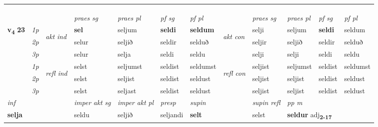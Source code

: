 \begin{longtable}[l]{X>{\footnotesize\itshape}llXXXXlXXXX}
\midrule
 & \\*
   & \\*
  & \\
   \midrule
 & &   & \textit{praes sg}  & \textit{praes pl}    & \textit{ pf sg} & \textit{pf pl} & & \textit{praes sg}  & \textit{praes pl}    & \textit{pf sg} & \textit{pf pl }  \\ \cmidrule{4-7} \cmidrule{9-12}
 \multirow{2}{*}{{{\textbf{v{\textsubscript{4}}} \Large{\textbf{23}}}}}  & 1p & \multirow{3}{*}{\begin{turn}{90}\textit{akt ind}\end{turn}} & \textbf{sel} & seljum & \textbf{seldi} & \textbf{seldum} & \multirow{3}{*}{\begin{turn}{90}\textit{akt con}\end{turn}} &selji & seljum & \textbf{seldi} & seldum\\*
 & 2p &  &  selur  & seljið & seldir & selduð & & seljir & seljið & seldir & selduð \\*
 & 3p &  & selur & selja & seldi & seldu & & selji & selji& seldi & seldu \\*
\cmidrule{4-7} \cmidrule{9-12}
 & 1p & \multirow{3}{*}{\begin{turn}{90}\textit{refl ind}\end{turn}}  & selst & seljumst & seldist & seldumst & \multirow{3}{*}{\begin{turn}{90}\textit{refl con}\end{turn}}  &seljist & seljumst & seldist & seldumst \\*
 & 2p &  & selst & seljist & seldist & seldust & &seljist & seljist & seldist & seldust \\*
 & 3p  & & selst & seljast & seldist & seldust & & seljist & seljist& seldist & seldust \\*
\cmidrule{4-7} \cmidrule{9-12}

   {\textit{inf}} & &  & \textit{imper akt sg} & \textit{imper akt pl}   & \textit{presp} & \textit{supin} && \textit{supin refl} & \textit{pp m} \\*
  {\textbf{selja}} & && seldu  & seljið   & seljandi &  \textbf{selt} && selst & \multicolumn{2}{l}{\textbf{seldur} adj\textbf{\textsubscript{2-17}}} \\*

\midrule


\end{longtable}
